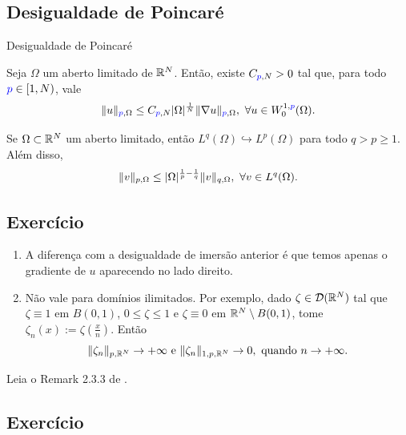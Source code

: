 \subsection*{Desigualdade de Poincaré}
\begin{frame}{Desigualdade de Poincaré}

\begin{teo}
Seja \(\Omega\) um aberto {\color{red} limitado } de \(\mathbb{R}^N\). Então, existe \(C_{{\color{blue}p},N}>0\) tal que, para todo  \({\color{blue} p }\in [1,N)\), vale
\begin{equation*}
\lVert u\rVert_{{\color{blue} p },\Omega}\leq C_{{\color{blue}p},N} |\Omega|^{\frac{1}{N}} \lVert\nabla u\rVert_{{\color{blue} p },\Omega},\ \forall u\in W_0^{1,{\color{blue} p }}(\Omega).
\end{equation*}
\end{teo}

\begin{exer}
Se \(\Omega\subset \mathbb{R}^N\) um aberto {\color{red}limitado}, então \(L^q(\Omega)\hookrightarrow L^p(\Omega)\) para todo \(q>p\geq 1\). Além disso, 
\[
\lVert v\rVert_{p,\Omega}\leq |\Omega|^{\frac{1}{p}-\frac{1}{q}}\lVert v\rVert_{q,\Omega},\ \forall v\in L^q(\Omega).
\]
\end{exer}
\subsection*{Exercício \theexer}

\end{frame}


\begin{frame}


\begin{obs}
\begin{enumerate}
\item A diferença com a desigualdade de imersão anterior é que temos apenas o gradiente de \(u \) aparecendo no lado direito.
\item Não vale para domínios ilimitados. Por exemplo, dado \(\zeta\in \mathcal{D}(\mathbb{R}^N)\) tal que \(\zeta\equiv 1\) em \(B(0,1)\), \(0\leq \zeta \leq 1\) e \(\zeta\equiv 0\) em \(\mathbb{R}^N\setminus B(0,1)\), tome
\(\zeta_n(x):=\zeta\left(\frac{x}{n}\right).\)
Então
\[
\lVert\zeta_n\rVert_{p,\mathbb{R}^N}\to +\infty \text{ e } \lVert\zeta_n\rVert_{1,p,\mathbb{R}^N}\to 0, \text{ quando } n\to +\infty.
\]
\end{enumerate}
\end{obs}

\begin{exer}
Leia o Remark 2.3.3 de \cite{kesavan}.
\end{exer}
\subsection*{Exercício \theexer}
\end{frame}


